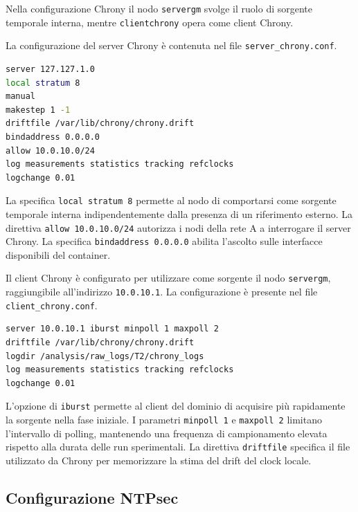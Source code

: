 Nella configurazione Chrony il nodo \texttt{servergm} svolge il ruolo di
sorgente temporale interna, mentre \texttt{clientchrony} opera come client
Chrony.

La configurazione del server Chrony è contenuta nel file \texttt{server\_chrony.conf}.

\begin{lstlisting}[language=bash,caption={Configurazione Chrony del nodo servergm.},label={lst:chrony-server}]
server 127.127.1.0
local stratum 8
manual
makestep 1 -1
driftfile /var/lib/chrony/chrony.drift
bindaddress 0.0.0.0
allow 10.0.10.0/24
log measurements statistics tracking refclocks
logchange 0.01
\end{lstlisting}

La specifica \texttt{local stratum 8} permette al nodo di comportarsi come sorgente
temporale interna indipendentemente dalla presenza di un riferimento esterno. La
direttiva \texttt{allow 10.0.10.0/24} autorizza i nodi della rete A a interrogare
il server Chrony. La specifica \texttt{bindaddress 0.0.0.0} abilita l'ascolto sulle
interfacce disponibili del container.

\begin{sloppypar}
  Il client Chrony è configurato per utilizzare come sorgente il nodo \texttt{servergm},
  raggiungibile all'indirizzo \texttt{10.0.10.1}. La configurazione è presente nel file
  \texttt{client\_chrony.conf}.
\end{sloppypar}

\begin{lstlisting}[language=bash,caption={Configurazione Chrony del nodo clientchrony.},label={lst:chrony-client}]
server 10.0.10.1 iburst minpoll 1 maxpoll 2
driftfile /var/lib/chrony/chrony.drift
logdir /analysis/raw_logs/T2/chrony_logs
log measurements statistics tracking refclocks
logchange 0.01
\end{lstlisting}

L'opzione di \texttt{iburst} permette al client del dominio di acquisire più
rapidamente la sorgente nella fase iniziale. I parametri \texttt{minpoll 1} e
\texttt{maxpoll 2} limitano l'intervallo di polling, mantenendo una frequenza di
campionamento elevata rispetto alla durata delle run sperimentali. La direttiva \texttt{driftfile}
specifica il file utilizzato da Chrony per memorizzare la stima del drift del
clock locale.

\subsection{Configurazione NTPsec}

